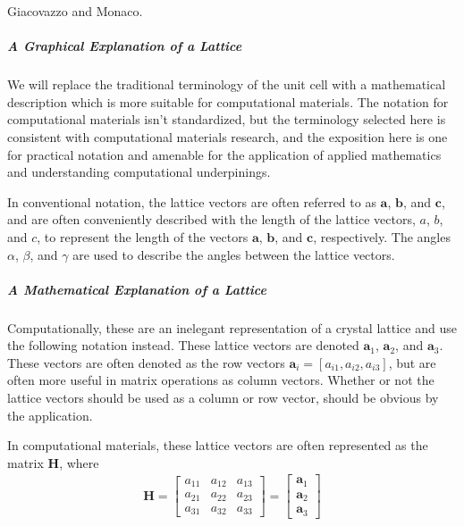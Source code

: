 \documentclass[letterpaper,10pt,english]{sphinxmanual}
\begin{document}
\label{\detokenize{crystallography/perfect_crystal:id4}}{\hyperref[\detokenize{crystallography/perfect_crystal:giacovazzo2002-book-crystal}]{\sphinxcrossref{{[}Gia02{]}}}} Giacovazzo and Monaco. 


\subparagraph{A Graphical Explanation of a Lattice}
\label{\detokenize{crystallography/perfect_crystal:a-graphical-explanation-of-a-lattice}}
We will replace the traditional terminology of the unit cell with a mathematical description which is more suitable for computational materials.  The notation for computational materials isn’t standardized, but the terminology selected here is consistent with computational materials research, and the exposition here is one for practical notation and amenable for the application of applied mathematics and understanding computational underpinings.

In conventional notation, the lattice vectors are often referred to as \(\mathbf{a}\), \(\mathbf{b}\), and \(\mathbf{c}\), and are often conveniently described with the length of the lattice vectors, \(a\), \(b\), and \(c\), to represent the length of the vectors \(\mathbf{a}\), \(\mathbf{b}\), and \(\mathbf{c}\), respectively.  The angles \(\alpha\), \(\beta\), and \(\gamma\) are used to describe the angles between the lattice vectors.


\subparagraph{A Mathematical Explanation of a Lattice}
\label{\detokenize{crystallography/perfect_crystal:a-mathematical-explanation-of-a-lattice}}
Computationally, these are an inelegant representation of a crystal lattice and use the following notation instead.  These lattice vectors are denoted \(\mathbf{a}_1\), \(\mathbf{a}_2\), and \(\mathbf{a}_3\).  These vectors are often denoted as the row vectors \(\mathbf{a}_{i} = [a_{i1}, a_{i2}, a_{i3}]\), but are often more useful in matrix operations as column vectors.  Whether or not the lattice vectors should be used as a column or row vector, should be obvious by the application.

In computational materials, these lattice vectors are often represented as the matrix \(\mathbf{H}\), where
\begin{equation*}
\begin{split}\mathbf{H}
=
\begin{bmatrix}
    a_{11} & a_{12} & a_{13} \\
    a_{21} & a_{22} & a_{23} \\
    a_{31} & a_{32} & a_{33}
\end{bmatrix}
=
\begin{bmatrix}
    \mathbf{a}_1 \\
    \mathbf{a}_2 \\
    \mathbf{a}_3
\end{bmatrix}\end{split}
\end{equation*}
\end{document}

